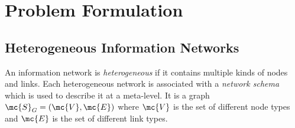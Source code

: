 \section{Problem Formulation}\label{sec:problem}

\subsection{Heterogeneous Information Networks}

An information network is \emph{heterogeneous} if it contains multiple kinds of nodes and links.
Each heterogeneous network is associated with a \emph{network schema} \cite{sun2011pathsim} which is used to describe it at a meta-level. It is a graph $\mc{S}_G=(\mc{V}, \mc{E})$ where $\mc{V}$ is the set of different node types and $\mc{E}$ is the set of different link types.


